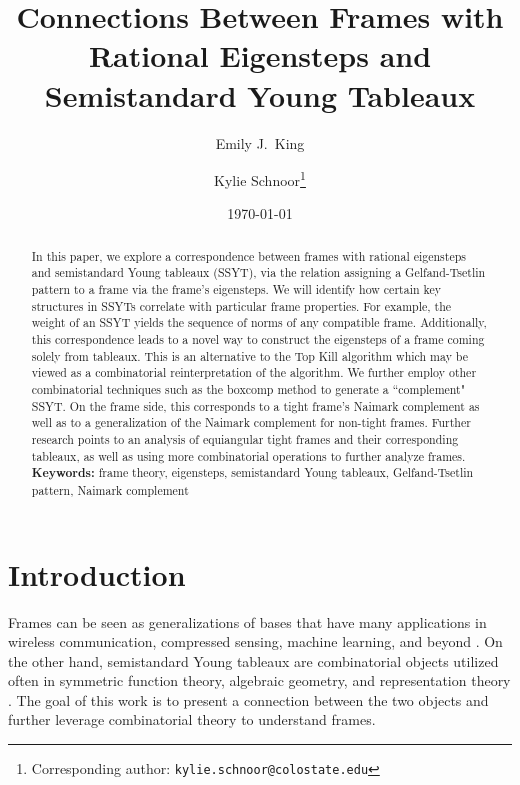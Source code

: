 \documentclass[10pt]{article}
\title{Connections Between Frames with Rational Eigensteps and Semistandard Young Tableaux}
\author[1]{Emily J.\ King}
\author[1]{Kylie Schnoor\thanks{Corresponding author: \texttt{kylie.schnoor@colostate.edu}}}
\affil[1]{Department of Mathematics, Colorado State University, Fort Collins, CO}
\date{\today}
\theoremstyle{plain}
\theoremstyle{definition}
\begin{document}
\maketitle
\begin{abstract}
In this paper, we explore a correspondence between frames with rational eigensteps and semistandard Young tableaux (SSYT), via the relation assigning a Gelfand-Tsetlin pattern to a frame via the frame's eigensteps. We will identify how certain key structures in SSYTs correlate with particular frame properties. For example, the weight of an SSYT yields the sequence of norms of any compatible frame. Additionally, this correspondence leads to a novel way to construct the eigensteps of a frame coming solely from tableaux. This is an alternative to the Top Kill algorithm which may be viewed as a combinatorial reinterpretation of the algorithm. We further employ other combinatorial techniques such as the boxcomp method to generate a ``complement" SSYT. On the frame side, this corresponds to a tight frame's Naimark complement as well as to a generalization of the Naimark complement for non-tight frames. Further research points to an analysis of equiangular tight frames and their corresponding tableaux, as well as using more combinatorial operations to further analyze frames. \textbf{Keywords:} frame theory, eigensteps, semistandard Young tableaux, Gelfand-Tsetlin pattern, Naimark complement
\end{abstract}

\section{Introduction}

Frames can be seen as generalizations of bases that have many applications in wireless communication, compressed sensing, machine learning, and beyond \cite{CKentf, GVKapplication, strohmer2003grassmannianframesapplicationscoding,papyan2020prevalence,FoRa13}. On the other hand, semistandard Young tableaux are combinatorial objects utilized often in symmetric function theory, algebraic geometry, and representation theory \cite{FultonTableaux, Stanleycombinatorics, GRgeneralized, CrystalBases, RepTheory}. The goal of this work is to present a connection between the two objects and further leverage combinatorial theory to  understand frames.
\end{document}
